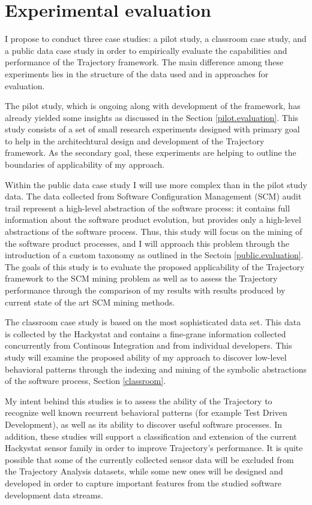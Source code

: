 \chapter{Experimental evaluation} \label{experiments}
I propose to conduct three case studies: a pilot study, a classroom case study, and a public data case study in order to empirically evaluate the capabilities and performance of the Trajectory framework. The main difference among these experiments lies in the structure of the data used and in approaches for evaluation. 

The pilot study, which is ongoing along with development of the framework, has already yielded some insights as discussed in the Section \ref{pilot.evaluation}. This study consists of a set of small research experiments designed with primary goal to help in the architechtural design and development of the Trajectory framework. As the secondary goal, these experiments are helping to outline the boundaries of applicability of my approach.

Within the public data case study I will use more complex than in the pilot study data. The data collected from Software Configuration Management (SCM) audit trail represent a high-level abstraction of the software process: it contains full information about the software product evolution, but provides only a high-level abstractions of the software process. Thus, this study will focus on the mining of the software product processes, and I will approach this problem through the introduction of a custom taxonomy as outlined in the Sectoin \ref{public.evaluation}. The goals of this study is to evaluate the proposed applicability of the Trajectory framework to the SCM mining problem as well as to assess the Trajectory performance through the comparison of my results with results produced by current state of the art SCM mining methods.

The classroom case study is based on the most sophisticated data set. This data is collected by the Hackystat and contains a fine-grane information collected concurrently from Continous Integration and from individual developers. This study will examine the proposed ability of my approach to discover low-level behavioral patterns through the indexing and mining of the symbolic abstractions of the software process, Section \ref{classroom}. 

My intent behind this studies is to assess the ability of the Trajectory to recognize well known recurrent behavioral patterns (for example Test Driven Development), as well as its ability to discover useful software processes. In addition, these studies will support a classification and extension of the current Hackystat sensor family in order to improve Trajectory's performance. It is quite possible that some of the currently collected sensor data will be excluded from the Trajectory Analysis datasets, while some new ones will be designed and developed in order to capture important features from the studied software development data streams.

